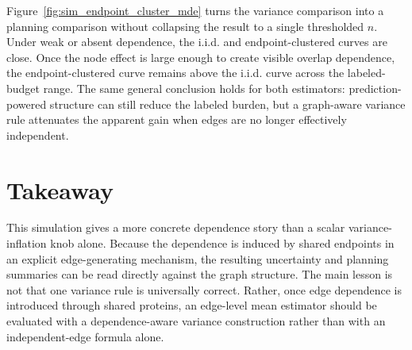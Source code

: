 Figure~\ref{fig:sim_endpoint_cluster_mde} turns the variance comparison into a planning comparison without collapsing the result to a single thresholded $n$. Under weak or absent dependence, the i.i.d. and endpoint-clustered curves are close. Once the node effect is large enough to create visible overlap dependence, the endpoint-clustered curve remains above the i.i.d. curve across the labeled-budget range. The same general conclusion holds for both estimators: prediction-powered structure can still reduce the labeled burden, but a graph-aware variance rule attenuates the apparent gain when edges are no longer effectively independent.

\section{Takeaway}

This simulation gives a more concrete dependence story than a scalar variance-inflation knob alone. Because the dependence is induced by shared endpoints in an explicit edge-generating mechanism, the resulting uncertainty and planning summaries can be read directly against the graph structure. The main lesson is not that one variance rule is universally correct. Rather, once edge dependence is introduced through shared proteins, an edge-level mean estimator should be evaluated with a dependence-aware variance construction rather than with an independent-edge formula alone.
